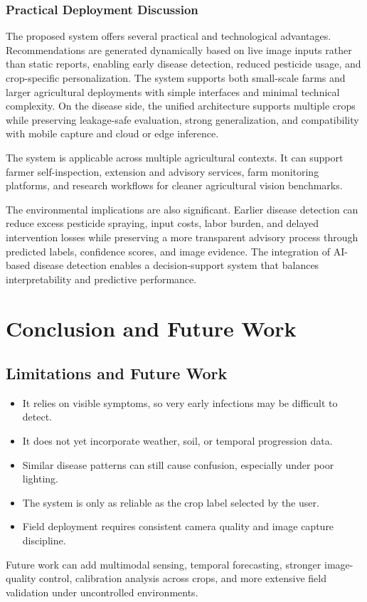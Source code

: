 \documentclass[12pt,a4paper]{report}
\begin{document}
\subsection{Practical Deployment Discussion}
The proposed system offers several practical and technological advantages. Recommendations are generated dynamically based on live image inputs rather than static reports, enabling early disease detection, reduced pesticide usage, and crop-specific personalization. The system supports both small-scale farms and larger agricultural deployments with simple interfaces and minimal technical complexity. On the disease side, the unified architecture supports multiple crops while preserving leakage-safe evaluation, strong generalization, and compatibility with mobile capture and cloud or edge inference.

The system is applicable across multiple agricultural contexts. It can support farmer self-inspection, extension and advisory services, farm monitoring platforms, and research workflows for cleaner agricultural vision benchmarks.

The environmental implications are also significant. Earlier disease detection can reduce excess pesticide spraying, input costs, labor burden, and delayed intervention losses while preserving a more transparent advisory process through predicted labels, confidence scores, and image evidence. The integration of AI-based disease detection enables a decision-support system that balances interpretability and predictive performance.

\chapter{Conclusion and Future Work}

\section{Limitations and Future Work}
\begin{itemize}
\item It relies on visible symptoms, so very early infections may be difficult to detect.
\item It does not yet incorporate weather, soil, or temporal progression data.
\item Similar disease patterns can still cause confusion, especially under poor lighting.
\item The system is only as reliable as the crop label selected by the user.
\item Field deployment requires consistent camera quality and image capture discipline.
\end{itemize}
Future work can add multimodal sensing, temporal forecasting, stronger image-quality control, calibration analysis across crops, and more extensive field validation under uncontrolled environments.
\end{document}
